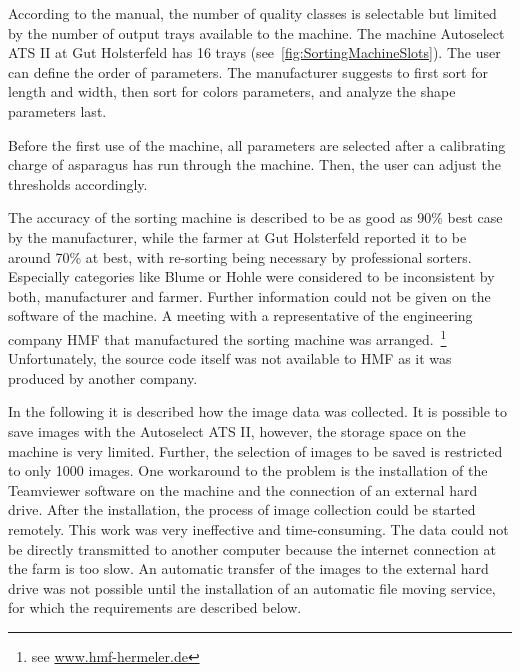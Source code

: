 According to the manual, the number of quality classes is selectable but limited by the number of output trays available to the machine. The machine Autoselect ATS II at Gut Holsterfeld has 16 trays (see~\autoref{fig:SortingMachineSlots}). The user can define the order of parameters. The manufacturer suggests to first sort for length and width, then sort for colors parameters, and analyze the shape parameters last.

Before the first use of the machine, all parameters are selected after a calibrating charge of asparagus has run through the machine. Then, the user can adjust the thresholds accordingly.

The accuracy of the sorting machine is described to be as good as 90\% best case by the manufacturer, while the farmer at Gut Holsterfeld reported it to be around 70\% at best, with re-sorting being necessary by professional sorters. Especially categories like Blume or Hohle were considered to be inconsistent by both, manufacturer and farmer. Further information could not be given on the software of the machine. A meeting with a representative of the engineering company HMF that manufactured the sorting machine was arranged.~\footnote{ see \url{www.hmf-hermeler.de}} Unfortunately, the source code itself was not available to HMF as it was produced by another company. 

\bigskip
In the following it is described how the image data was collected. It is possible to save images with the Autoselect ATS II, however, the storage space on the machine is very limited. Further, the selection of images to be saved is restricted to only 1000 images.
One workaround to the problem is the installation of the Teamviewer software on the machine and the connection of an external hard drive. After the installation, the process of image collection could be started remotely. This work was very ineffective and time-consuming. The data could not be directly transmitted to another computer because the internet connection at the farm is too slow. An automatic transfer of the images to the external hard drive was not possible until the installation of an automatic file moving service, for which the requirements are described below.

